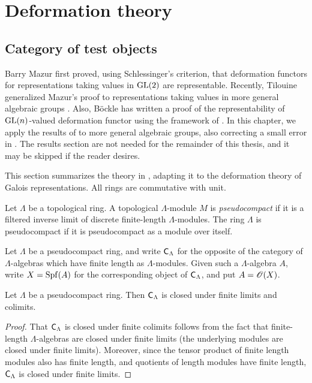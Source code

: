 
\chapter{Deformation theory}





\section{Category of test objects}

Barry Mazur first proved, using Schlessinger's criterion, that deformation 
functors for representations taking values in $\operatorname{GL}(2)$ are representable. 
Recently, Tilouine generalized Mazur's proof to representations taking values 
in more general algebraic groups \cite{tilouine-1996}. Also, B\"ockle has 
written a proof of the representability of $\operatorname{GL}(n)$-valued deformation functor 
using the framework of \cite{sga3-1}. In this chapter, we apply the results 
of \cite{sga3-1} to more general algebraic groups, also correcting a small 
error in \cite{bockle-2013}. The results section are not needed for the 
remainder of this thesis, and it may be skipped if the reader desires. 

This section summarizes the theory in 
\cite[VII\textsubscript{B}, \S 0--1]{sga3-1}, adapting it to the deformation 
theory of Galois representations. All rings are commutative with unit. 

\begin{definition}
Let $\Lambda$ be a topological ring. A topological $\Lambda$-module $M$ is 
\emph{pseudocompact} if it is a filtered inverse limit of discrete 
finite-length $\Lambda$-modules. The ring $\Lambda$ is pseudocompact if it 
is pseudocompact as a module over itself. 
\end{definition}

Let $\Lambda$ be a pseudocompact ring, and write $\mathsf{C}_\Lambda$ for the 
opposite of the category of $\Lambda$-algebras which have finite length as 
$\Lambda$-modules. Given such a $\Lambda$-algebra $A$, write $X=\operatorname{Spf}(A)$ for 
the corresponding object of $\mathsf{C}_\Lambda$, and put $A=\mathscr{O}(X)$. 

\begin{lemma}
Let $\Lambda$ be a pseudocompact ring. Then $\mathsf{C}_\Lambda$ is closed under 
finite limits and colimits. 
\end{lemma}
\begin{proof}
That $\mathsf{C}_\Lambda$ is closed under finite colimits follows from the fact that 
finite-length $\Lambda$-algebras are closed under finite limits (the 
underlying modules are closed under finite limits). Moreover, since the tensor 
product of finite length modules also has finite length, and quotients of 
length modules have finite length, $\mathsf{C}_\Lambda$ is closed under finite 
limits. 
\end{proof}

